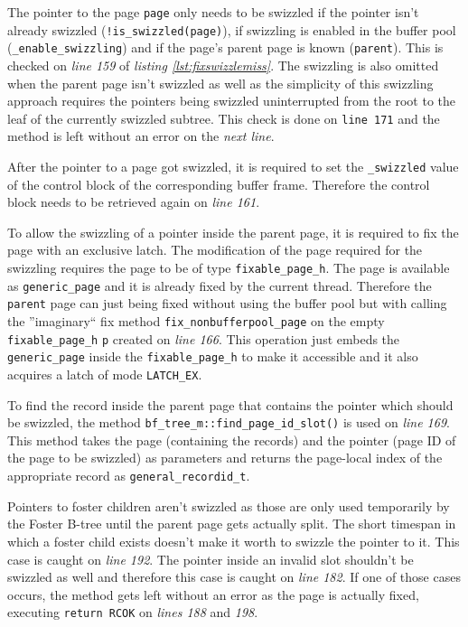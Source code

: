 	The pointer to the page \lstinline{page} only needs to be swizzled if the pointer isn't already swizzled (\lstinline{!is_swizzled(page)}), if swizzling is enabled in the buffer pool (\lstinline{_enable_swizzling}) and if the page's parent page is known (\lstinline{parent}). This is checked on \emph{line 159} of \emph{listing \ref{lst:fixswizzlemiss}}. The swizzling is also omitted when the parent page isn't swizzled as well as the simplicity of this swizzling approach requires the pointers being swizzled uninterrupted from the root to the leaf of the currently swizzled subtree. This check is done on \lstinline{line 171} and the method is left without an error on the \emph{next line}.
	
	After the pointer to a page got swizzled, it is required to set the \lstinline{_swizzled} value of the control block of the corresponding buffer frame. Therefore the control block needs to be retrieved again on \emph{line 161}.
	
	To allow the swizzling of a pointer inside the parent page, it is required to fix the page with an exclusive latch. The modification of the page required for the swizzling requires the page to be of type \lstinline{fixable_page_h}. The page is available as \lstinline{generic_page} and it is already fixed by the current thread. Therefore the \lstinline{parent} page can just being fixed without using the buffer pool but with calling the ''imaginary`` fix method \lstinline{fix_nonbufferpool_page} on the empty \lstinline{fixable_page_h} \lstinline{p} created on \emph{line 166}. This operation just embeds the \lstinline{generic_page} inside the \lstinline{fixable_page_h} to make it accessible and it also acquires a latch of mode \lstinline{LATCH_EX}.
	
	To find the record inside the parent page that contains the pointer which should be swizzled, the method \lstinline{bf_tree_m::find_page_id_slot()} is used on \emph{line 169}. This method takes the page (containing the records) and the pointer (page ID of the page to be swizzled) as parameters and returns the page-local index of the appropriate record as \lstinline{general_recordid_t}.
	
	Pointers to foster children aren't swizzled as those are only used temporarily by the Foster B-tree until the parent page gets actually split. The short timespan in which a foster child exists doesn't make it worth to swizzle the pointer to it. This case is caught on \emph{line 192}. The pointer inside an invalid slot shouldn't be swizzled as well and therefore this case is caught on \emph{line 182}. If one of those cases occurs, the method gets left without an error as the page is actually fixed, executing \lstinline{return RCOK} on \emph{lines 188} and \emph{198}.
	
